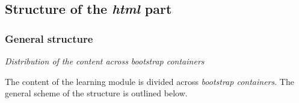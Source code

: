 \documentclass[12pt]{article}
\begin{document}
%


\subsection{Structure of the \emph{html} part}\label{SecHowHtm}


\subsubsection{General structure}


\vspace{1em}
\noindent\emph{Distribution of the content across bootstrap containers}

The content of the learning module is divided across \emph{bootstrap containers}. 
%
The general scheme of the structure is outlined below. 
\end{document}
